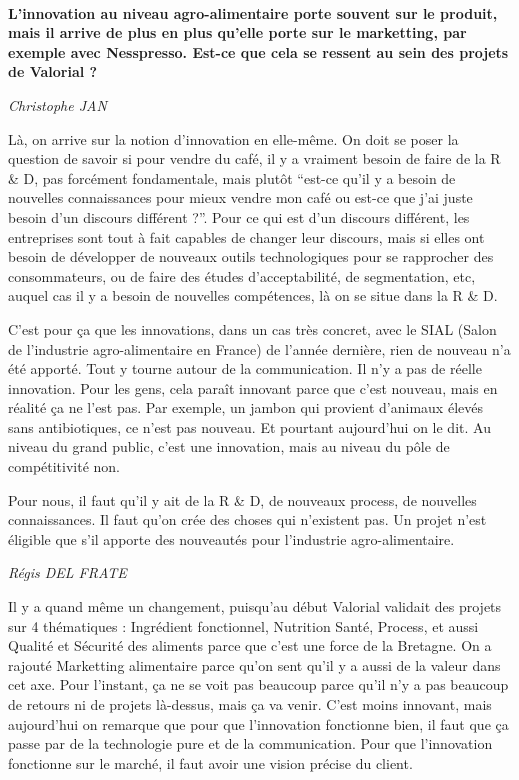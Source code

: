 \documentclass[a4paper,12pt]{report}
\begin{document}
	\textbf{\\L’innovation au niveau agro-alimentaire porte souvent sur le produit, mais il arrive de plus en plus qu’elle porte sur le marketting, par exemple avec Nesspresso. Est-ce que cela se ressent au sein des projets de Valorial ?}

	\emph{Christophe JAN}
	
    Là, on arrive sur la notion d’innovation en elle-même. On doit se poser la question de savoir si pour vendre du café, il y a vraiment besoin de faire de la R \& D, pas forcément fondamentale, mais plutôt “est-ce qu’il y a besoin de nouvelles connaissances pour mieux vendre mon café ou est-ce que j’ai juste besoin d’un discours différent ?”. Pour ce qui est d’un discours différent, les entreprises sont tout à fait capables de changer leur discours, mais si elles ont besoin de développer de nouveaux outils technologiques pour se rapprocher des consommateurs, ou de faire des études d’acceptabilité, de segmentation, etc, auquel cas il y a besoin de nouvelles compétences, là on se situe dans la R \& D.
   
    C’est pour ça que les innovations, dans un cas très concret, avec le SIAL (Salon de l'industrie agro-alimentaire en France) de l’année dernière, rien de nouveau n’a été apporté. Tout y tourne autour de la communication. Il n’y a pas de réelle innovation. Pour les gens, cela paraît innovant parce que c’est nouveau, mais en réalité ça ne l’est pas. Par exemple, un jambon qui provient d’animaux élevés sans antibiotiques, ce n’est pas nouveau. Et pourtant aujourd’hui on le dit. Au niveau du grand public, c’est une innovation, mais au niveau du pôle de compétitivité non.
   
    Pour nous, il faut qu’il y ait de la R \& D, de nouveaux process, de nouvelles connaissances. Il faut qu’on crée des choses qui n’existent pas. Un projet n’est éligible que s’il apporte des nouveautés pour l’industrie agro-alimentaire. 

	\emph{Régis DEL FRATE}
    
    Il y a quand même un changement, puisqu’au début Valorial validait des projets sur 4 thématiques : Ingrédient fonctionnel, Nutrition Santé, Process, et aussi Qualité et Sécurité des aliments parce que c’est une force de la Bretagne. On a rajouté Marketting alimentaire parce qu’on sent qu’il y a aussi de la valeur dans cet axe. Pour l’instant, ça ne se voit pas beaucoup parce qu’il n’y a pas beaucoup de retours ni de projets là-dessus, mais ça va venir. C’est moins innovant, mais aujourd’hui on remarque que pour que l’innovation fonctionne bien, il faut que ça passe par de la technologie pure et de la communication. Pour que l’innovation fonctionne sur le marché, il faut avoir une vision précise du client.
	
\end{document}
